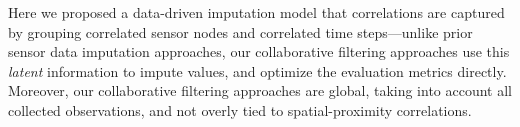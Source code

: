 Here we proposed a data-driven imputation model that
correlations are captured by grouping correlated sensor nodes and correlated time
steps---unlike prior sensor data imputation approaches, our collaborative filtering
approaches use this {\em latent} information to impute values, and optimize the evaluation metrics directly. 
Moreover, our collaborative filtering approaches are global, taking into account all
collected observations, and not overly tied to spatial-proximity
correlations.  



